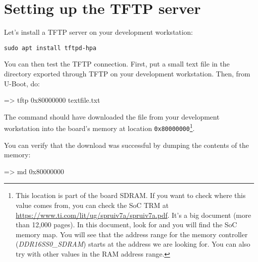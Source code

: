 \section{Setting up the TFTP server}

Let's install a TFTP server on your development workstation:

\begin{verbatim}
sudo apt install tftpd-hpa
\end{verbatim}

You can then test the TFTP connection. First, put a small text file in
the directory exported through TFTP on your development
workstation. Then, from U-Boot, do:

\begin{ubootinput}
=> tftp 0x80000000 textfile.txt
\end{ubootinput}

The  command should have downloaded the
 file from your development workstation into
the board's memory at location {\tt 0x80000000}\footnote{
This location is part of the board SDRAM. If you want
to check where this value comes from, you can check the SoC
TRM at
\url{https://www.ti.com/lit/ug/spruiv7a/spruiv7a.pdf}.
It's a big document (more than 12,000 pages). In this document, look
for  and you will find the SoC memory map.
You will see that the address range for the memory controller
({\em DDR16SS0\_SDRAM})
starts at the address we are looking for.
You can also try with other values in the RAM address range.}.

You can verify that the download was successful by dumping the
contents of the memory:

\begin{ubootinput}
=> md 0x80000000
\end{ubootinput}

